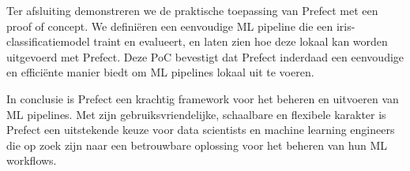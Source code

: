 Ter afsluiting demonstreren we de praktische toepassing van Prefect met een proof of concept. We definiëren een eenvoudige ML pipeline die een iris-classificatiemodel traint en evalueert, en laten zien hoe deze lokaal kan worden uitgevoerd met Prefect. Deze PoC bevestigt dat Prefect inderdaad een eenvoudige en efficiënte manier biedt om ML pipelines lokaal uit te voeren.

In conclusie is Prefect een krachtig framework voor het beheren en uitvoeren van ML pipelines. Met zijn gebruiksvriendelijke, schaalbare en flexibele karakter is Prefect een uitstekende keuze voor data scientists en machine learning engineers die op zoek zijn naar een betrouwbare oplossing voor het beheren van hun ML workflows.



